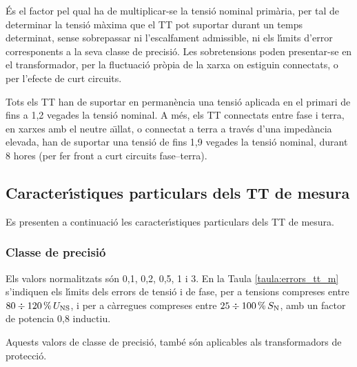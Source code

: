  \'{E}s el factor pel qual ha de
multiplicar-se la tensi\'{o} nominal prim\`{a}ria, per tal de determinar la
tensi\'{o} m\`{a}xima que el TT pot suportar durant un temps determinat,
sense sobrepassar ni l'escalfament admissible, ni els l\'{\i}mits d'error
corresponents a la seva classe de precisi\'{o}. Les sobretensions poden
presentar-se en el transformador,  per la fluctuaci\'{o}
    pr\`{o}pia de la xarxa on estiguin connectats, o per l'efecte de curt
    circuits.

    Tots els  TT han de suportar   en perman\`{e}ncia una tensi\'{o} aplicada en
    el primari de fins a  1,2 vegades la tensi\'{o} nominal. A m\'{e}s, els TT
connectats entre fase i terra, en xarxes amb el neutre a\"{\i}llat, o
connectat a terra a trav\'{e}s d'una imped\`{a}ncia elevada, han de suportar
    una tensi\'{o} de fins 1,9 vegades la tensi\'{o} nominal, durant 8 hores (per fer front a
    curt circuits fase--terra).


\subsection{Caracter\'{\i}stiques particulars dels TT de mesura}

Es presenten a continuaci\'{o} les caracter\'{\i}stiques particulars dels TT
de mesura.

\subsubsection{Classe de precisi\'{o}}

 Els valors normalitzats s\'{o}n
0,1, 0,2, 0,5, 1 i 3. En la Taula \vref{taula:errors_tt_m} s'indiquen els l\'{\i}mits dels
errors de tensi\'{o} i  de fase, per a tensions compreses entre $80 \div 120\mathrm{\,\%} \,U_\mathrm{NS}$,
i per a c\`{a}rregues compreses entre  $25 \div 100\mathrm{\,\%} \,S_\mathrm{N}$, amb un factor de potencia
0,8 inductiu.

Aquests valors de classe de precisi\'{o}, tamb\'{e} s\'{o}n aplicables als
transformadors de protecci\'{o}.

